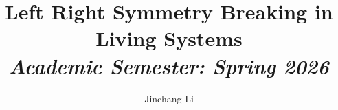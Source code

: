 \documentclass{article}
\begin{document}
 \title{{Left Right Symmetry Breaking in Living Systems}\\{\normalsize{\itshape Academic Semester: Spring 2026}}}
	\author{Jinchang Li}
	\maketitle
    \pagestyle{fancynotes}
	\newpage


\end{document}
